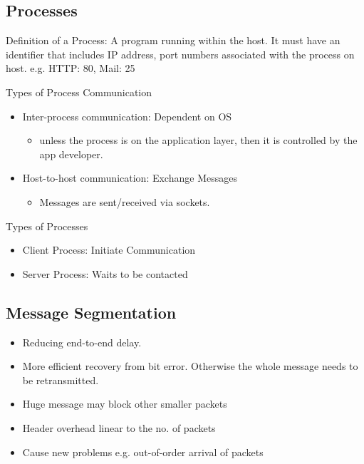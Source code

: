 \documentclass[a4paper]{article}
\begin{document}
\subsection{Processes}
Definition of a Process: A program running within the host. It must have an identifier that includes IP address, port numbers associated with the process on host. e.g. HTTP: 80, Mail: 25

\medskip

\noindent Types of Process Communication
\begin{itemize}
    \item Inter-process communication: Dependent on OS
    \begin{itemize}[label=$\circ$]
        \item unless the process is on the application layer, then it is controlled by the app developer.
    \end{itemize}
    \item Host-to-host communication: Exchange Messages
    \begin{itemize}[label=$\circ$]
        \item Messages are sent/received via sockets.
    \end{itemize}
\end{itemize}

\noindent Types of Processes
\begin{itemize}
    \item Client Process: Initiate Communication
    \item Server Process: Waits to be contacted
\end{itemize}

\subsection{Message Segmentation}
\begin{itemize}
    \item Reducing end-to-end delay.
    \item More efficient recovery from bit error. Otherwise the whole message needs to be retransmitted.
    \item Huge message may block other smaller packets
    \item Header overhead linear to the no. of packets
    \item Cause new problems e.g. out-of-order arrival of packets
    \end{itemize}

\newpage
\end{document}
